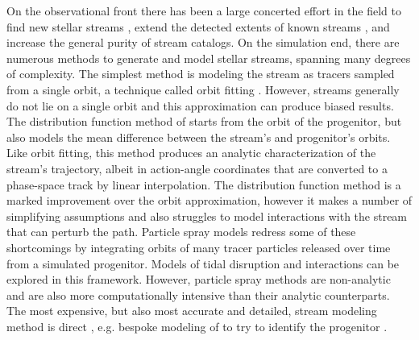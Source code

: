 \documentclass[fleqn,usenatbib]{mnras}
\begin{document}
  On the observational front there has been a large concerted effort in the
  field to find new stellar streams \citep[for an extensive list of known
  Galactic streams see][]{Mateu2022}, extend the detected extents of known
  streams \citep[e.g. for  alone:][]{Rockosi2002, Ibata2017,
  Grillmair2006, Carlberg2012, Starkman2019}, and increase the general purity of
  stream catalogs. On the simulation end, there are numerous methods to generate
  and model stellar streams, spanning many degrees of complexity. The simplest
  method is modeling the stream as tracers sampled from a single orbit, a
  technique called orbit fitting \citep[e.g.][]{Johnston1999, Malhan2019}.
  However, streams generally do not lie on a single orbit
  \citep{SandersBinney2013I} and this approximation can produce biased results.
  The distribution function method of \citet{Bovy2014} starts from the orbit of
  the progenitor, but also models the mean difference between the stream's and
  progenitor's orbits. Like orbit fitting, this method produces an analytic
  characterization of the stream's trajectory, albeit in action-angle
  coordinates that are converted to a phase-space track by linear interpolation.
  The distribution function method is a marked improvement over the orbit
  approximation, however it makes a number of simplifying assumptions and also
  struggles to model interactions with the stream that can perturb the path.
  Particle spray models \citep[e.g.][]{Fardal2015,Bonaca2014} redress some of
  these shortcomings by integrating orbits of many tracer particles released
  over time from a simulated progenitor. Models of tidal disruption and
  interactions can be explored in this framework. However, particle spray
  methods are non-analytic and are also more computationally intensive than
  their analytic counterparts. The most expensive, but also most accurate and
  detailed, stream modeling method is direct \nbodys{}, e.g. bespoke
  modeling of  to try to identify the progenitor \citep{Webb2019}.
  
\end{document}
